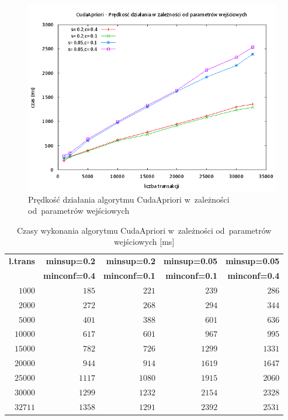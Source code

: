 \begin{figure}[H]
\centering
\includegraphics[width=1.1\textwidth]{figures/06/capriori.png}
\caption{Prędkość działania algorytmu CudaApriori w~zależności od~parametrów wejściowych\label{rys:capriori}}
\end{figure}

\begin{table}
	\centering
	\begin{tabular}{r|r|r|r|r}
	\textbf{l.trans} & \textbf{minsup=0.2} & \textbf{minsup=0.2} & \textbf{minsup=0.05} & \textbf{minsup=0.05}  \\
	 & \textbf{minconf=0.4} & \textbf{minconf=0.1} & \textbf{minconf=0.1} & \textbf{minconf=0.4}  \\ \hline
	$1000$ & $185$ & $221$ & $239$ & $286$ \\
	$2000$ & $272$ & $268$ & $294$ & $344$ \\
	$5000$ & $401$ & $388$ & $601$ & $636$ \\
	$10000$ & $617$ & $601$ & $967$ & $995$ \\
	$15000$ & $782$ & $726$ & $1299$ & $1331$ \\
	$20000$ & $944$ & $914$ & $1619$ & $1647$ \\
	$25000$ & $1117$ & $1080$ & $1915$ & $2060$ \\
	$30000$ & $1299$ & $1232$ & $2154$ & $2328$ \\
	$32711$ & $1358$ & $1291$ & $2392$ & $2531$ \\
	\end{tabular}
	\caption{Czasy wykonania algorytmu CudaApriori w~zależności od~parametrów wejściowych [ms]\label{tab:capriori}}
\end{table}


